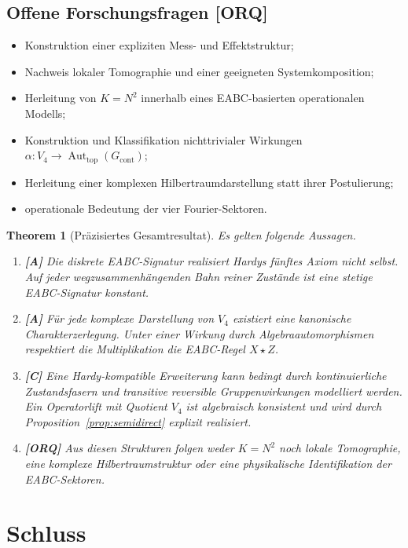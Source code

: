 \documentclass[11pt,a4paper,reqno]{amsart}
\newtheorem{theorem}{Theorem}[section]
\theoremstyle{definition}
\theoremstyle{remark}
\newcommand{\Aut}{\operatorname{Aut}}
\newcommand{\StatusA}{\textnormal{\textbf{[A]}}}
\newcommand{\StatusC}{\textnormal{\textbf{[C]}}}
\newcommand{\StatusORQ}{\textnormal{\textbf{[ORQ]}}}
\begin{document}
\subsection*{Offene Forschungsfragen \StatusORQ}
\begin{itemize}[leftmargin=2.2em]
  \item Konstruktion einer expliziten Mess- und Effektstruktur;
  \item Nachweis lokaler Tomographie und einer geeigneten Systemkomposition;
  \item Herleitung von $K=N^2$ innerhalb eines EABC-basierten operationalen Modells;
  \item Konstruktion und Klassifikation nichttrivialer Wirkungen
  $\alpha:V_4\to\Aut_{\mathrm{top}}(G_{\mathrm{cont}})$;
  \item Herleitung einer komplexen Hilbertraumdarstellung statt ihrer Postulierung;
  \item operationale Bedeutung der vier Fourier-Sektoren.
\end{itemize}

\begin{theorem}[Präzisiertes Gesamtresultat]
\label{thm:conclusion}
Es gelten folgende Aussagen.
\begin{enumerate}[label=\textup{(\arabic*)},leftmargin=2.5em]
  \item \StatusA{} Die diskrete EABC-Signatur realisiert Hardys fünftes Axiom nicht selbst. Auf jeder wegzusammenhängenden Bahn reiner Zustände ist eine stetige EABC-Signatur konstant.
  \item \StatusA{} Für jede komplexe Darstellung von $V_4$ existiert eine kanonische Charakterzerlegung. Unter einer Wirkung durch Algebraautomorphismen respektiert die Multiplikation die EABC-Regel $X\star Z$.
  \item \StatusC{} Eine Hardy-kompatible Erweiterung kann bedingt durch kontinuierliche Zustandsfasern und transitive reversible Gruppenwirkungen modelliert werden. Ein Operatorlift mit Quotient $V_4$ ist algebraisch konsistent und wird durch Proposition~\ref{prop:semidirect} explizit realisiert.
  \item \StatusORQ{} Aus diesen Strukturen folgen weder $K=N^2$ noch lokale Tomographie, eine komplexe Hilbertraumstruktur oder eine physikalische Identifikation der EABC-Sektoren.
\end{enumerate}
\end{theorem}

\section{Schluss}
\end{document}
